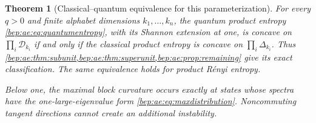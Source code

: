 \documentclass[11pt]{article}
\numberwithin{equation}{section}
\newtheorem{theorem}{Theorem}[section]
\theoremstyle{definition}
\theoremstyle{remark}
\begin{document}
\begin{theorem}[Classical--quantum equivalence for this parameterization]
\label{bep:ae:thm:quantum}
For every $q>0$ and finite alphabet dimensions $k_1,\ldots,k_n$, the
quantum product entropy \eqref{bep:ae:eq:quantumentropy}, with its Shannon
extension at one, is concave on $\prod_i\mathcal D_{k_i}$ if and only if
the classical product entropy is concave on $\prod_i\Delta_{k_i}$.
Thus \cref{bep:ae:thm:subunit,bep:ae:thm:superunit,bep:ae:prop:remaining} give its exact
classification. The same equivalence holds for product R\'enyi entropy.

Below one, the maximal block curvature occurs exactly at states whose
spectra have the one-large-eigenvalue form \eqref{bep:ae:eq:maxdistribution}.
Noncommuting tangent directions cannot create an additional instability.
\end{theorem}
\end{document}
